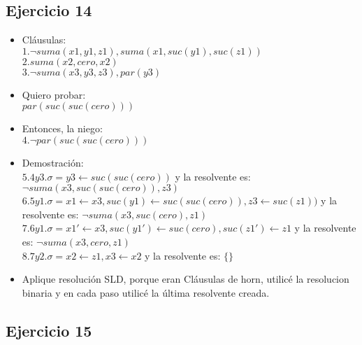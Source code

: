 \documentclass[10pt,a4paper]{article}
\begin{document}
  \subsection{Ejercicio 14}
	\begin{itemize}
	    \item Cláusulas: \\
		$1.{\neg suma(x1,y1,z1), suma(x1,suc(y1),suc(z1))}$ \\
		$2.{suma(x2,cero,x2)}$ \\
		$3.{\neg suma(x3,y3,z3), par(y3)}$
	    \item Quiero probar: \\
		${par(suc(suc(cero)))}$
	    \item Entonces, la niego: \\
		$4.{\neg par(suc(suc(cero)))}$
	    \item Demostración: \\
		$5.4y3. \sigma={y3 \leftarrow suc(suc(cero))}$ y la resolvente es: $ {\neg suma(x3,suc(suc(cero)),z3)}$ \\
		$6.5y1. \sigma={x1 \leftarrow x3,suc(y1) \leftarrow suc(suc(cero)),z3 \leftarrow suc(z1))}$ y la resolvente es: ${\neg suma(x3,suc(cero),z1)}$ \\
		$7.6y1. \sigma={x1' \leftarrow x3, suc(y1') \leftarrow suc(cero), suc(z1') \leftarrow z1}$ y la resolvente es: $ {\neg suma(x3,cero, z1)}$ \\
		$8.7y2. \sigma={x2 \leftarrow z1, x3 \leftarrow x2} $ y la resolvente es: $ \{\}$
	    \item Aplique resolución SLD, porque eran Cláusulas de horn, utilicé la resolucion binaria y en cada paso utilicé la última resolvente creada.
	\end{itemize}
  \subsection{Ejercicio 15}
\end{document}
